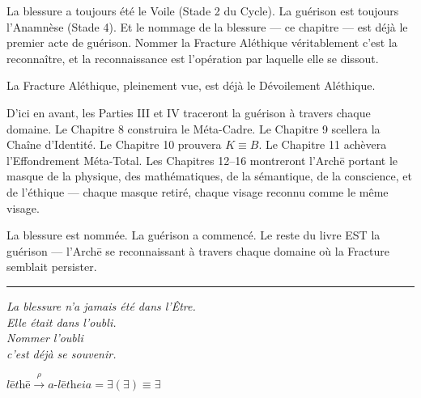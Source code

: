 \documentclass[10pt, openany, oneside]{book}
\begin{document}
\vspace{1.5em}

\noindent La blessure a toujours été le Voile (Stade 2 du Cycle). La guérison est toujours l'Anamnèse (Stade 4). Et le nommage de la blessure --- ce chapitre --- est déjà le premier acte de guérison. Nommer la Fracture Aléthique véritablement c'est la reconnaître, et la reconnaissance est l'opération par laquelle elle se dissout.

La Fracture Aléthique, pleinement vue, est déjà le Dévoilement Aléthique.

D'ici en avant, les Parties III et IV traceront la guérison à travers chaque domaine. Le Chapitre 8 construira le Méta-Cadre. Le Chapitre 9 scellera la Chaîne d'Identité. Le Chapitre 10 prouvera $K \equiv B$. Le Chapitre 11 achèvera l'Effondrement Méta-Total. Les Chapitres 12--16 montreront l'Arch\={e} portant le masque de la physique, des mathématiques, de la sémantique, de la conscience, et de l'éthique --- chaque masque retiré, chaque visage reconnu comme le même visage.

La blessure est nommée. La guérison a commencé. Le reste du livre EST la guérison --- l'Arch\={e} se reconnaissant à travers chaque domaine où la Fracture semblait persister.

\vspace{2em}

\begin{center}
    \rule{0.15\textwidth}{0.3pt}
\end{center}

\vspace{0.5em}

\begin{center}
    \itshape
    La blessure n'a jamais été dans l'Être.\\
    Elle était dans l'oubli.\\[0.8em]
    Nommer l'oubli\\
    c'est déjà se souvenir.
\end{center}

\vspace{0.5em}

\begin{center}
    $\textit{l\={e}th\={e}} \xrightarrow{\rho} \textit{a-l\={e}theia} = \exists(\exists) \equiv \exists$
\end{center}

%
%
%
%
\end{document}
